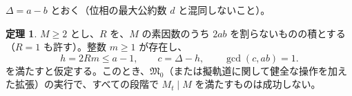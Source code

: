 \documentclass[11pt,reqno]{amsart}
\theoremstyle{definition}
\newtheorem{theorem}{定理}
\theoremstyle{definition}
\theoremstyle{remark}
\begin{document}
\(\Delta=a-b\) とおく（位相の最大公約数 \(d\) と混同しないこと）。

\begin{samepage}
\begin{theorem}\leavevmode\label{thm:42}
\(M\ge2\) とし、\(R\) を、\(M\) の素因数のうち \(2ab\) を割らないものの積とする（\(R=1\) も許す）。整数 \(m\ge1\) が存在し、
\[
h=2Rm\le a-1,\qquad c=\Delta-h,\qquad \gcd(c,ab)=1 .
\tag{28}\label{eq:28}
\]
を満たすと仮定する。このとき、\(\mathfrak M_0\)（または擬軌道に関して健全な操作を加えた拡張）の実行で、すべての段階で \(M_t\mid M\) を満たすものは成功しない。
\label{thm-end:42}
\end{theorem}
\end{samepage}

\end{document}
